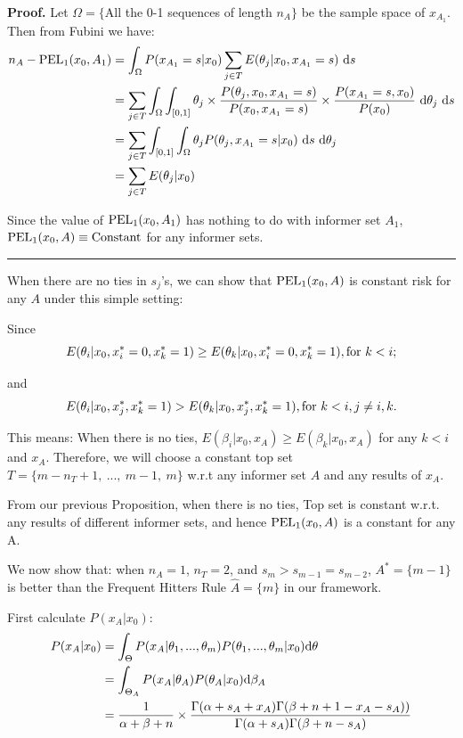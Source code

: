 \documentclass[12pt]{article}
\newenvironment{proof}[1][Proof]{\noindent\textbf{#1.} }{\ \rule{0.5em}{0.5em}}
\begin{document}
\begin{proof}
Let $\Omega = \{$All the 0-1 sequences of length $n_A \}$ be the sample space of $x_{A_1}$. Then from Fubini we have: 
\begin{align*}
    n_A - {\rm PEL}_1(x_0, A_1) &= \int_\Omega P(x_{A_1} = s|x_0)\sum_{j\in T} E(\theta_j|x_0, x_{A_1} = s) ~{\rm d}s\\
    &= \sum_{j\in T} \int_\Omega \int_{[0,1]} \theta_j \times \frac{P(\theta_j,x_0,x_{A_1}=s )}{P(x_0,x_{A_1} = s)}\times \frac{P(x_{A_1} = s, x_0)}{P(x_0)}~{\rm d}\theta_j~{\rm d}s\\
    &= \sum_{j \in T} \int_{[0,1]}\int_\Omega \theta_j P(\theta_j, x_{A_1} = s|x_0) ~{\rm d}s~{\rm d}\theta_j\\
    &= \sum_{j\in T}E(\theta_j|x_0)
\end{align*}

Since the value of ${\rm PEL}_1(x_0,A_1)$ has nothing to do with informer set $A_1$, ${\rm PEL}_1(x_0, A) \equiv {\rm Constant}$ for any informer sets.
\end{proof}

When there are no ties in $s_j$'s, we can show that ${\rm PEL}_1(x_0, A)$ is constant risk for any $A$ under this simple setting:

Since
$$
E(\theta_i|x_0, x_i^* = 0, x_k^* = 1) \geq
E(\theta_k|x_0,x_i^* = 0, x_k^* = 1), {\rm for}~k < i;
$$

and
$$
E(\theta_i|x_0, x_j^*, x_k^* = 1) > E(\theta_k|x_0,x_j^*, x_k^* = 1), {\rm for}~k < i, j \neq i,k.
$$

This means: When there is no ties, $E(\beta_i|x_0, x_A) \geq E(\beta_k|x_0, x_A)$ for any $k < i$ and $x_A$. Therefore, we will choose a constant top set $T = \{m-n_T+1,~...,~m-1,~m\}$ w.r.t any informer set $A$ and any results of $x_A$. 

From our previous Proposition, when there is no ties, Top set is constant w.r.t. any results of different informer sets, and hence ${\rm PEL}_1(x_0, A)$ is a constant for any A. 

We now show that: when $n_A = 1$, $n_T = 2$, and $s_m > s_{m-1} = s_{m-2}$, $A^* = \{m-1\}$ is better than the Frequent Hitters Rule $\hat{A} = \{m\}$ in our framework.

First calculate $P(x_A|x_0)$:
\begin{align*}
    P(x_A|x_0) 
    &= \int_\Theta P(x_A|\theta_1,...,\theta_m)P(\theta_1,...,\theta_m|x_0){\rm d}\theta\\
    &= \int_{\Theta_A} P(x_A|\theta_A)P(\theta_A|x_0){\rm d}\beta_A\\
    &= \frac{1}{\alpha+\beta+n}\times\frac{\Gamma(\alpha+s_A+x_A)\Gamma(\beta+n+1-x_A-s_A))}{\Gamma(\alpha+s_A)\Gamma(\beta+n-s_A)}
\end{align*}
\end{document}
